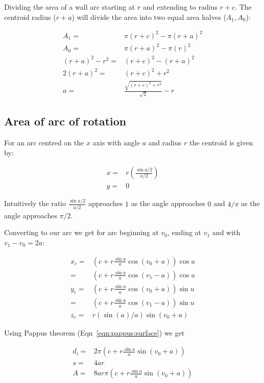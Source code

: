 \documentclass[a4paper,10pt]{article}
\begin{document}
Dividing the area of a wall arc starting at $r$ and extending
to radius $r + c$. The centroid radius ($r + a$) will divide the area
into two equal area halves ($A_1, A_0$):

\begin{align*}
A_1 =& \pi(r+c)^2 - \pi(r+a)^2 \\
A_0 =& \pi(r+a)^2 - \pi(r)^2 \\
(r+a)^2 - r^2 =& (r+c)^2 - (r+a)^2 \\
2(r+a)^2 =& (r+c)^2 + r^2 \\
a =&  \frac{\sqrt{(r+c)^2 + r^2}}{\sqrt{2}} - r
\end{align*}

\subsection{Area of arc of rotation}
For an arc centred on the $x$ axis with angle $a$ and
radius $r$ the centroid is given by:

\begin{align}
x =& r\left(\frac{\sin{a/2}}{a/2}\right) \label{eqn:centroid:arc} \\
y =& 0 \nonumber{}
\end{align}

Intuitively the ratio $\frac{\sin{a/2}}{a/2}$ approaches
$1$ as the angle approaches $0$ and $4/\pi{}$ as the angle
approaches $\pi{}/2$.

Converting to our arc we get for arc beginning at $v_0$,
ending at $v_1$ and with $v_1 - v_0 = 2a$:

\begin{align}
x_c =& \left(c + r \frac{\sin{a}}{a} \cos{(v_0 + a)}\right) \cos{u} \\
    =& \left(c + r \frac{\sin{a}}{a} \cos{(v_1 - a)}\right) \cos{u} \\
y_c =& \left(c + r \frac{\sin{a}}{a} \cos{(v_0 + a)}\right) \sin{u} \\
    =& \left(c + r \frac{\sin{a}}{a} \cos{(v_1 - a)}\right) \sin{u} \\
z_c =& r (\sin{(a)}/a) \sin{(v_0 + a)}
\end{align}

Using Pappus theorem (Eqn~\ref{eqn:pappus:surface}) we get

\begin{align}
d_i =& 2\pi{}\left( c + r \frac{\sin{a}}{a} \sin{(v_0 + a)}\right) \\
s =& 4ar \\
A =& 8ar\pi{}\left( c + r \frac{\sin{a}}{a} \sin{(v_0 + a)}\right)
\end{align}
\end{document}
